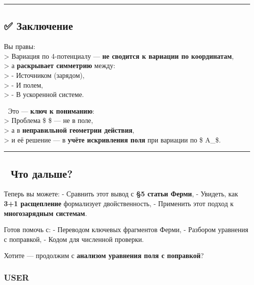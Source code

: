 \documentclass[11pt]{article}
\begin{document}
\begin{center}\rule{0.5\linewidth}{\linethickness}\end{center}

\subsection{✅
Заключение}\label{ux437ux430ux43aux43bux44eux447ux435ux43dux438ux435-2}

Вы правы:\\
\textgreater{} Вариация по 4-потенциалу --- \textbf{не сводится к
вариации по координатам},\\
\textgreater{} а \textbf{раскрывает симметрию} между:\\
\textgreater{} - Источником (зарядом),\\
\textgreater{} - И полем,\\
\textgreater{} - В ускоренной системе.

📌 Это --- \textbf{ключ к пониманию}:\\
\textgreater{} Проблема \$  \$ --- не в поле,\\
\textgreater{} а в \textbf{неправильной геометрии действия},\\
\textgreater{} и её решение --- в \textbf{учёте искривления поля} при
вариации по \$ A\_\mu \$.

\begin{center}\rule{0.5\linewidth}{\linethickness}\end{center}

\subsection{🎯 Что
дальше?}\label{ux447ux442ux43e-ux434ux430ux43bux44cux448ux435-4}

Теперь вы можете: - Сравнить этот вывод с \textbf{§5 статьи Ферми}, -
Увидеть, как \textbf{3+1 расщепление} формализует двойственность, -
Применить этот подход к \textbf{многозарядным системам}.

Готов помочь с: - Переводом ключевых фрагментов Ферми, - Разбором
уравнения с поправкой, - Кодом для численной проверки.

Хотите --- продолжим с \textbf{анализом уравнения поля с поправкой}?

\subsubsection{USER}\label{user-6}
\end{document}
